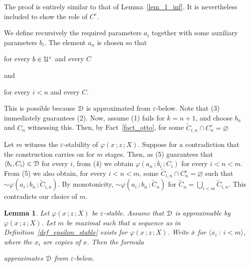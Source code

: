\documentclass{amsproc}
\makeatletter
\newcounter{thm}
\theoremstyle{mio}
\newtheorem{lemma}[thm]{Lemma}\tcolorboxenvironment{lemma}{mythm}
\providecommand{\proofNameStyle}{\bfseries}
\renewenvironment{proof}[1][\proofname]{\par
  \pushQED{\qed}%
  \normalfont%
  \trivlist
  \item[\hskip\labelsep
        \proofNameStyle
    #1\@addpunct{.}]\ignorespaces
}{%
  \popQED\endtrivlist\@endpefalse
}
\makeatother
\begin{document}
The proof is entirely similar to that of Lemma~\ref{lem_1_inf}.
It is nevertheless included to show the role of $C^\varepsilon$.

\begin{proof}
  We define recursively the required parameters $a_i$ together with some auxiliary parameters $b_i$.
  The element $a_n$ is chosen so that

\hfill for every $b\in{\EuScript U}^z$ and every $C$

and

\hfill for every $i<n$ and every $C$.\smallskip

This is possible because ${\EuScript D}$ is approximated from $\varepsilon$-below.
Note that (3) immediately guarantees (2).
Now, assume (1) fails for $k=n+1$, and choose $b_n$ and $C_n$ witnessing this.
Then, by Fact~\ref{fact_otto}, for some $\tilde C_{i,n}\cap C_n^\varepsilon=\varnothing$


Let $m$ witness the $\varepsilon$-stability of $\varphi(x\,;z\,;X)$.
Suppose for a contradiction that the construction carries on for $m$ stages.
Then, as (5) guarantees that $\langle b_i,C_i\rangle\in{\EuScript D}$ for every $i$, from (4) we obtain $\varphi(a_n\,;b_i\,;C_i)$ for every $i<n<m$.
From (5) we also obtain, for every $i< n<m$, some $\tilde C_{i,n}\cap C_n^\varepsilon=\varnothing$ such that ${\sim}\varphi(a_i\,;b_n\,;\tilde C_{i,n})$.
By monotonicity, ${\sim}\varphi(a_i\,;b_n\,;\tilde C_n)$ for $\tilde C_n=\bigcup_{i< m}\tilde C_{i,n}$.
This contradicts our choice of $m$.
\end{proof}

\begin{lemma}
  Let $\varphi(x\,;z\,;X)$ be $\varepsilon$-stable.
  Assume that ${\EuScript D}$ is approximable by $\varphi(x\,;z\,;X)$.
  Let $m$ be maximal such that a sequence as in Definition~\ref{def_epsilon_stable} exists for $\varphi(x\,;z\,;X)$.
  Write $\bar x$ for $\langle x_i\ :\ i<m\rangle$, where the $x_i$ are copies of $x$.
  Then the formula\smallskip

  \smallskip

  approximates ${\EuScript D}$ from $\varepsilon$-below.
\end{lemma}
\end{document}
